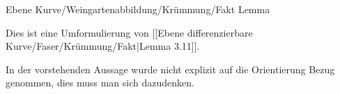 {Ebene Kurve/Weingartenabbildung/Krümmung/Fakt}
{Lemma}
{}
{

\faktzusatz {}
\faktzusatz {}

}
{

Dies ist eine Umformulierung von
[[Ebene differenzierbare Kurve/Faser/Krümmung/Fakt|Lemma 3.11]].

}

In der vorstehenden Aussage wurde nicht explizit auf die Orientierung Bezug genommen, dies muss man sich dazudenken.

